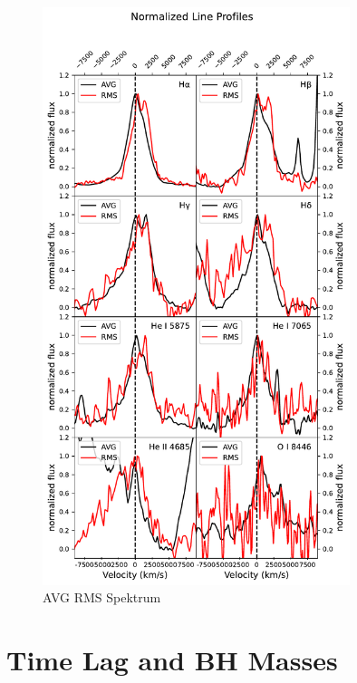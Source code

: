 \begin{figure}[!ht]
	\centering
	\includegraphics[width=0.8\textwidth]{pictures/Chapter4/line_profiles/Normalized_Line_Profiles.pdf}
	\caption{AVG RMS Spektrum}
	\label{fig:line_profiles}
\end{figure}

\section{Time Lag and BH Masses}

